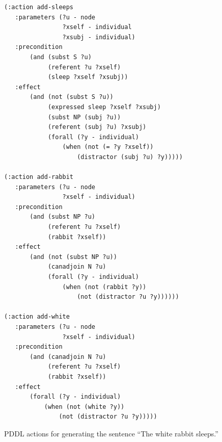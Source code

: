 \begin{figure}[p]
\centering
\begin{minipage}{0.5\textwidth}
{\small%
\begin{verbatim}
(:action add-sleeps
   :parameters (?u - node
                ?xself - individual
                ?xsubj - individual)
   :precondition
       (and (subst S ?u)
            (referent ?u ?xself)
            (sleep ?xself ?xsubj))
   :effect 
       (and (not (subst S ?u))
            (expressed sleep ?xself ?xsubj)
            (subst NP (subj ?u))
            (referent (subj ?u) ?xsubj)
            (forall (?y - individual)
                (when (not (= ?y ?xself))
                    (distractor (subj ?u) ?y)))))

(:action add-rabbit
   :parameters (?u - node
                ?xself - individual)
   :precondition 
       (and (subst NP ?u)
            (referent ?u ?xself)
            (rabbit ?xself))
   :effect 
       (and (not (subst NP ?u))
            (canadjoin N ?u)
            (forall (?y - individual)
                (when (not (rabbit ?y))
                    (not (distractor ?u ?y))))))

(:action add-white
   :parameters (?u - node
                ?xself - individual)
   :precondition 
       (and (canadjoin N ?u)
            (referent ?u ?xself)
            (rabbit ?xself))
   :effect 
       (forall (?y - individual)
           (when (not (white ?y))
               (not (distractor ?u ?y)))))
\end{verbatim}}%
\end{minipage}
\caption{PDDL actions for generating the sentence ``The white rabbit
sleeps.''}
\label{fig:white-rabbit-as-planning}
\end{figure}

